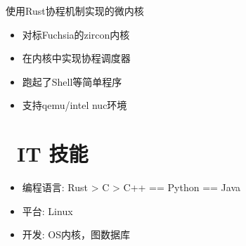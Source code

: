 \documentclass{resume}
\begin{document}
\begin{onehalfspacing}
使用Rust协程机制实现的微内核
\begin{itemize}
  \item 对标Fuchsia的zircon内核
  \item 在内核中实现协程调度器
  \item 跑起了Shell等简单程序
  \item 支持qemu/intel nuc环境
\end{itemize}
\end{onehalfspacing}


\section{\faCogs\ IT 技能}
\begin{itemize}[parsep=0.5ex]
  \item 编程语言: Rust > C > C++ == Python == Java
  \item 平台: Linux
  \item 开发: OS内核，图数据库
\end{itemize}



%
%
\end{document}
